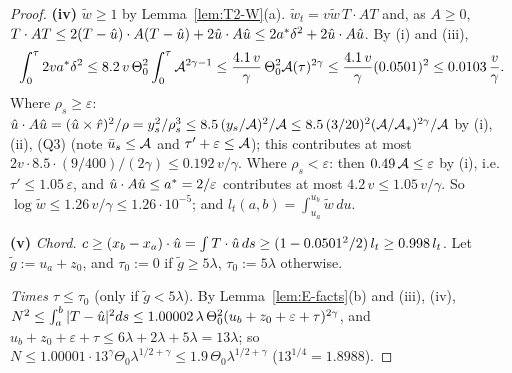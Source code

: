 \begin{proof}
\smallskip\textbf{(iv)} $\tilde w\ge1$ by Lemma~\ref{lem:T2-W}(a). $\tilde w_t=v\tilde w\,T\cdot AT$ and, as $A\ge0$,
$T\cdot AT\le2(T-\hat u)\cdot A(T-\hat u)+2\hat u\cdot A\hat u\le2a^*\delta^2+2\hat u\cdot A\hat u$. By (i) and (iii),
\[
\int_0^\tau2va^*\delta^2\le8.2\,v\,\Theta_0^2\int_0^\tau\mathcal A^{2\gamma-1}\le\frac{4.1\,v}\gamma\,\Theta_0^2\mathcal A(\tau)^{2\gamma}
\le\frac{4.1\,v}\gamma(0.0501)^2\le0.0103\,\frac v\gamma .
\]
Where $\rho_s\ge\varepsilon$: $\hat u\cdot A\hat u=(\hat u\times\hat r)^2/\rho=y_s^2/\rho_s^3\le8.5\,(y_s/\mathcal A)^2/\mathcal A
\le8.5\,(3/20)^2(\mathcal A/\mathcal A_*)^{2\gamma}/\mathcal A$ by (i), (ii), (Q3) (note $\bar u_s\le\mathcal A$ and $\tau'+\varepsilon\le\mathcal A$); this
contributes at most $2v\cdot8.5\cdot(9/400)/(2\gamma)\le0.192\,v/\gamma$. Where $\rho_s<\varepsilon$: then
$0.49\,\mathcal A\le\varepsilon$ by (i), i.e.\ $\tau'\le1.05\,\varepsilon$, and $\hat u\cdot A\hat u\le a^*=2/\varepsilon$ contributes at most
$4.2\,v\le1.05\,v/\gamma$. So $\log\tilde w\le1.26\,v/\gamma\le1.26\cdot10^{-5}$; and $l_t(a,b)=\int_{u_a}^{u_b}\tilde w\,du$.

\smallskip\textbf{(v)} \emph{Chord.} $c\ge(x_b-x_a)\cdot\hat u=\int T\cdot\hat u\,ds\ge(1-0.0501^2/2)\,l_t\ge0.998\,l_t$. Let
$\tilde g:=u_a+z_0$, and $\tau_0:=0$ if $\tilde g\ge5\lambda$, $\tau_0:=5\lambda$ otherwise.

\emph{Times $\tau\le\tau_0$} (only if $\tilde g<5\lambda$). By Lemma~\ref{lem:E-facts}(b) and (iii), (iv),
$N^2\le\int_a^b|T-\hat u|^2ds\le1.00002\,\lambda\,\Theta_0^2(u_b+z_0+\varepsilon+\tau)^{2\gamma}$, and
$u_b+z_0+\varepsilon+\tau\le6\lambda+2\lambda+5\lambda=13\lambda$; so
$N\le1.00001\cdot13^\gamma\Theta_0\lambda^{1/2+\gamma}\le1.9\,\Theta_0\lambda^{1/2+\gamma}$ ($13^{1/4}=1.8988$).


\end{proof}

